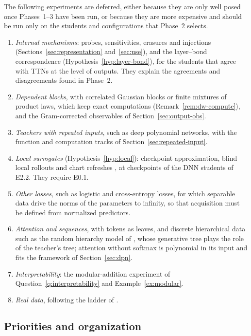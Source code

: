 \documentclass[11pt]{article}
\theoremstyle{definition}
\numberwithin{equation}{section}
\begin{document}
The following experiments are deferred, either because they are only well posed once Phases~1--3 have been run, or because they are more expensive and should be run only on the students and configurations that Phase~2 selects.
\begin{enumerate}[label=(\roman*),leftmargin=*]
\item \emph{Internal mechanisms}: probes, sensitivities, erasures and injections (Sections~\ref{sec:representation} and~\ref{sec:use}), and the layer--bond correspondence (Hypothesis~\ref{hyp:layer-bond}), for the students that agree with TTNs at the level of outputs. They explain the agreements and disagreements found in Phase~2.
\item \emph{Dependent blocks}, with correlated Gaussian blocks or finite mixtures of product laws, which keep exact computations (Remark~\ref{rem:dw-compute}), and the Gram-corrected observables of Section~\ref{sec:output-obs}.
\item \emph{Teachers with repeated inputs}, such as deep polynomial networks, with the function and computation tracks of Section~\ref{sec:repeated-input}.
\item \emph{Local surrogates} (Hypothesis~\ref{hyp:local}): checkpoint approximation, blind local rollouts and chart refreshes \citep[Sections~8.2--8.4]{hfl_surrogate}, at checkpoints of the DNN students of E2.2. They require E0.1.
\item \emph{Other losses}, such as logistic and cross-entropy losses, for which separable data drive the norms of the parameters to infinity, so that acquisition must be defined from normalized predictors.
\item \emph{Attention and sequences}, with tokens as leaves, and discrete hierarchical data such as the random hierarchy model of \citet{cagnetta2024deep}, whose generative tree plays the role of the teacher's tree; attention without softmax is polynomial in its input and fits the framework of Section~\ref{sec:dpn}.
\item \emph{Interpretability}: the modular-addition experiment of Question~\ref{q:interpretability} and Example~\ref{ex:modular}.
\item \emph{Real data}, following the ladder of \citet[Section~8.8]{hfl_surrogate}.
\end{enumerate}

\subsection{Priorities and organization}\label{sec:exp-organization}
\end{document}

